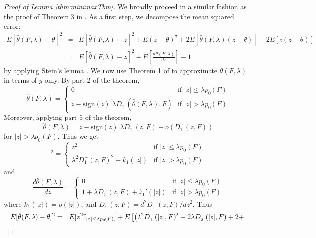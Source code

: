 \begin{proof}[Proof of Lemma \ref{thm:minimaxThm}]
We broadly proceed in a similar fashion as the proof of Theorem 3 in \cite{Zou06}. As a first step, we decompose the mean squared error:
%
\begin{eqnarray*}
E[ \hat\theta(F,\lambda) - \theta]^2 &=& E[ \hat\theta(F,\lambda) - z]^2 + E(z - \theta)^2 + 2 E [\hat\theta(F,\lambda) (z-\theta)] - 2E [z(z-\theta)]\\
&=& E[ \hat\theta(F,\lambda) - z]^2 + E \left[ \frac{d\hat\theta(F,\lambda)}{dz}\right] - 1
\end{eqnarray*}
%
by applying Stein's lemma \citep{Stein81}. We now use Theorem 1 of \cite{AntoniadisFan01} to approximate $\hat\theta(F,\lambda)$ in terms of $y$ only. By part 2 of the theorem,
%
\begin{equation}
\hat\theta(F,\lambda) = \begin{cases}
0 \quad & \text{if } |z| \leq \lambda p_0(F)\\
z - \text{sign}(z). \lambda D^-_1(\hat\theta(F,\lambda), F) & \text{if }|z| > \lambda p_0(F)
\end{cases}
\end{equation}
%
Moreover, applying part 5 of the theorem,
%
\begin{equation}
\hat\theta(F,\lambda) = z - \text{sign}(z).\lambda D^-_1(z, F) + o(D^-_1(z, F))
\end{equation}
%
for $|z| > \lambda p_0(F)$. Thus we get
%
\begin{equation}
[ \hat\theta(F,\lambda) - z]^2 = \begin{cases}
z^2 & \text{if } |z| \leq \lambda p_0(F)\\
\lambda^2 D^-_1(z,F)^2 + k_1(|z|) & \text{if } |z| > \lambda p_0(F)
\end{cases}
\end{equation}
%
and
%
\begin{equation}
\frac{d\hat\theta(F,\lambda)}{dz} = \begin{cases}
0 & \text{if } |z| \leq \lambda p_0(F)\\
1 +  \lambda D^-_2(z,F) + k_1'(|z|) & \text{if } |z| > \lambda p_0(F)
\end{cases}
\end{equation}
%
where $k_1(|z|) = o(|z|)$, and $D^-_2(z,F) = d^2D^-(z,F)/dz^2$. Thus
%
\begin{eqnarray}\label{eqn:MinimaxProofEqn1}
E [ \hat\theta(F,\lambda) - \theta]^2 &=& E [z^2 \BI_{|z| \leq \lambda p_0(F)}] + E \left[ \left(\lambda^2 D^-_1(|z|, F)^2 + 2 \lambda D^-_2(|z|,F) + 2 + \right.\right. \notag\\

\end{eqnarray}
\end{proof}
